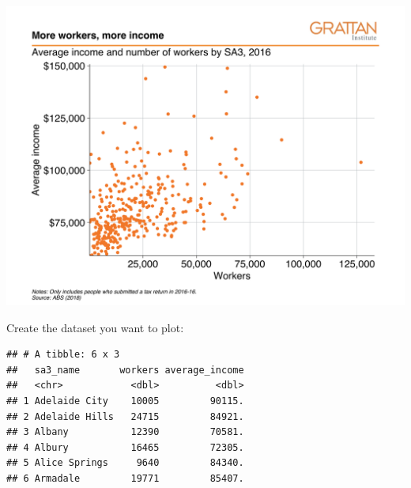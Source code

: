 \documentclass[]{book}
\newenvironment{Shaded}{\begin{snugshade}}{\end{snugshade}}
\newcommand{\DataTypeTok}[1]{\textcolor[rgb]{0.13,0.29,0.53}{#1}}
\newcommand{\DecValTok}[1]{\textcolor[rgb]{0.00,0.00,0.81}{#1}}
\newcommand{\KeywordTok}[1]{\textcolor[rgb]{0.13,0.29,0.53}{\textbf{#1}}}
\newcommand{\NormalTok}[1]{#1}
\newcommand{\OperatorTok}[1]{\textcolor[rgb]{0.81,0.36,0.00}{\textbf{#1}}}
\newcommand{\StringTok}[1]{\textcolor[rgb]{0.31,0.60,0.02}{#1}}
\begin{document}
\includegraphics[width=44.44in]{atlas/simple_scatter}

Create the dataset you want to plot:

\begin{Shaded}
\end{Shaded}

\begin{verbatim}
## # A tibble: 6 x 3
##   sa3_name       workers average_income
##   <chr>            <dbl>          <dbl>
## 1 Adelaide City    10005         90115.
## 2 Adelaide Hills   24715         84921.
## 3 Albany           12390         70581.
## 4 Albury           16465         72305.
## 5 Alice Springs     9640         84340.
## 6 Armadale         19771         85407.
\end{verbatim}
\end{document}
